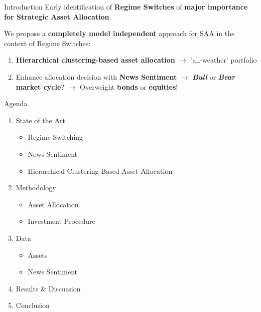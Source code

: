 


\begin{frame}[noframenumbering]{Introduction}
Early identification of \textbf{Regime Switches} of \textbf{major importance for Strategic Asset Allocation}. \vspace{0.4cm}

We propose a \textbf{completely model independent} approach for SAA in the context of Regime Switches:
	\begin{enumerate}
	    \item \textbf{Hierarchical clustering-based asset allocation} $\rightarrow$ ’all-weather’ portfolio 
	    \item Enhance allocation decision with \textbf{News Sentiment} $\rightarrow$ \textbf{\textit{Bull}} or \textbf{\textit{Bear}} \textbf{market cycle}? $\rightarrow$ Overweight \textbf{bonds} or \textbf{equities}!
	\end{enumerate}
\end{frame}

\begin{frame}[noframenumbering]{Agenda}
    \begin{enumerate}
        \item State of the Art
        \begin{itemize}
            \item Regime Switching
            \item News Sentiment
            \item Hierarchical Clustering-Based Asset Allocation
        \end{itemize}
        \item Methodology
        \begin{itemize}
            \item Asset Allocation
            \item Investment Procedure
        \end{itemize}
        \item Data
        \begin{itemize}
            \item Assets
            \item News Sentiment
        \end{itemize}
        \item Results \& Discussion
        \item Conclusion
    \end{enumerate}
\end{frame}